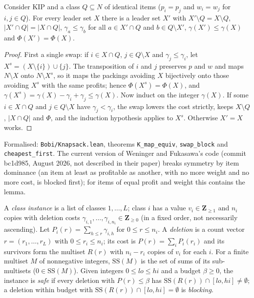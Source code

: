 \begin{lemma}\label{lem:kip-cheapest}
Consider KIP and a class $Q\subseteq N$ of identical items ($p_i=p_j$ and
$w_i=w_j$ for $i,j\in Q$). For every leader set $X$ there is a leader set $X'$
with $X'\setminus Q=X\setminus Q$, $|X'\cap Q|=|X\cap Q|$,
$\gamma_a\le\gamma_b$ for all $a\in X'\cap Q$ and $b\in Q\setminus X'$,
$\gamma(X')\le\gamma(X)$ and $\Phi(X')=\Phi(X)$.
\end{lemma}
\begin{proof}
First a single swap: if $i\in X\cap Q$, $j\in Q\setminus X$ and
$\gamma_j\le\gamma_i$, let $X^{s}=(X\setminus\{i\})\cup\{j\}$. The transposition of
$i$ and $j$ preserves $p$ and $w$ and maps $N\setminus X$ onto $N\setminus X^{s}$,
so it maps the packings avoiding $X$ bijectively onto those avoiding $X^{s}$
with the same profits; hence $\Phi(X^{s})=\Phi(X)$, and
$\gamma(X^{s})=\gamma(X)-\gamma_i+\gamma_j\le\gamma(X)$. Now induct on the integer
$\gamma(X)$. If some $i\in X\cap Q$ and $j\in Q\setminus X$ have $\gamma_j<\gamma_i$,
the swap lowers the cost strictly, keeps $X\setminus Q$, $|X\cap Q|$ and
$\Phi$, and the induction hypothesis applies to $X^{s}$. Otherwise $X'=X$
works.
\end{proof}
{\raggedright\noindent Formalised: \texttt{Bobi/Knapsack.lean}, theorems
\texttt{K\_map\_equiv}, \texttt{swap\_block} and \texttt{cheapest\_first}. The
current version of Weninger and Fukasawa's code (commit bc1d985, August 2026,
not described in their paper) breaks symmetry by item dominance (an item at
least as profitable as another, with no more weight and no more cost, is
blocked first); for items of equal profit and weight this contains the
lemma.\cite{weninger_bkpsolver}\par}

\begin{definition}\label{def:class-instance}
A \emph{class instance} is a list of classes $1,\dots,L$; class $i$ has a
value $v_i\in\mathbf{Z}_{\ge 1}$ and $n_i$ copies with deletion costs
$\gamma_{i,1},\dots,\gamma_{i,n_i}\in\mathbf{Z}_{\ge 0}$ (in a fixed order, not
necessarily ascending). Let $P_i(r)=\sum_{h\le r}\gamma_{i,h}$ for
$0\le r\le n_i$. A \emph{deletion} is a count vector $r=(r_1,\dots,r_L)$ with
$0\le r_i\le n_i$; its cost is $P(r)=\sum_i P_i(r_i)$ and its survivors form
the multiset $R(r)$ with $n_i-r_i$ copies of $v_i$ for each $i$. For a finite
multiset $M$ of nonnegative integers, $\mathrm{SS}(M)$ is the set of sums of its
sub-multisets ($0\in\mathrm{SS}(M)$). Given integers $0\le lo\le hi$ and a
budget $\beta\ge 0$, the instance is \emph{safe} if every deletion with
$P(r)\le\beta$ has $\mathrm{SS}(R(r))\cap[lo,hi]\neq\emptyset$; a deletion within
budget with $\mathrm{SS}(R(r))\cap[lo,hi]=\emptyset$ is \emph{blocking}.
\end{definition}

